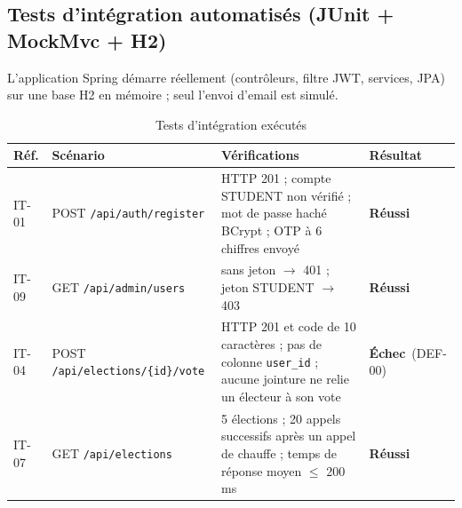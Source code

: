 \documentclass[12pt,a4paper]{report}
\newcommand{\ok}{\textcolor{okgreen}{\textbf{Réussi}}}
\newcommand{\ko}{\textcolor{kored}{\textbf{Échec}}}
\begin{document}
\subsection{Tests d'intégration automatisés (JUnit + MockMvc + H2)}
L'application Spring démarre réellement (contrôleurs, filtre JWT, services, JPA) sur une base H2 en mémoire ; seul l'envoi d'email est simulé.
\begin{table}[H]
\centering
\caption{Tests d'intégration exécutés}
\small
\begin{tabularx}{\textwidth}{@{}lp{4.4cm}Xp{1.9cm}@{}}
\toprule
\rowcolor{evlight}\textbf{Réf.} & \textbf{Scénario} & \textbf{Vérifications} & \textbf{Résultat}\\
\midrule
IT-01 & POST \nolinkurl{/api/auth/register} & HTTP 201 ; compte STUDENT non vérifié ; mot de passe haché BCrypt ; OTP à 6 chiffres envoyé & \ok\\
IT-09 & GET \nolinkurl{/api/admin/users} & sans jeton $\rightarrow$ 401 ; jeton STUDENT $\rightarrow$ 403 & \ok\\
IT-04 & POST \nolinkurl{/api/elections/{id}/vote} & HTTP 201 et code de 10 caractères ; pas de colonne \texttt{user\_id} ; aucune jointure ne relie un électeur à son vote & \ko\ (DEF-00)\\
IT-07 & GET \nolinkurl{/api/elections} & 5 élections ; 20 appels successifs après un appel de chauffe ; temps de réponse moyen $\leq$ 200\,ms & \ok\\
\bottomrule
\end{tabularx}
\end{table}
\end{document}
